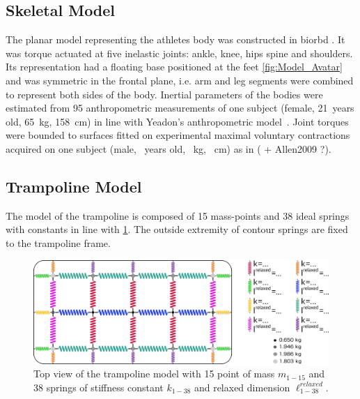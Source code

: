 \subsection{Skeletal Model}\label{subsec:2a}
The planar model representing the athletes body was constructed in biorbd \cite{michaudBiorbd2021}.
It was torque actuated at five inelastic joints: ankle, knee, hips spine and shoulders.
Its representation had a floating base positioned at the feet \ref{fig:Model_Avatar} and was symmetric in the frontal plane, i.e. arm and leg segments were combined to represent both sides of the body.
Inertial parameters of the bodies were estimated from 95 anthropometric measurements of one subject (female, 21~years old, 65~kg, 158~cm) in line with Yeadon's anthropometric model~\cite{yeadon1990simulation}.
Joint torques were bounded to surfaces fitted on experimental maximal voluntary contractions acquired on one subject (male, ~years old, ~kg, ~cm)  as in \cite{jackson2010mechanics} ( + Allen2009 ?).



\subsection{Trampoline Model}\label{subsec:2b}
The model of the trampoline is composed of 15 mass-points and 38 ideal springs with constants in line with \cite{jacques2008determining} \ref{fig:Model_Toile}.
The outside extremity of contour springs are fixed to the trampoline frame.

\begin{figure}[h!]
\centering
\includegraphics[width=\linewidth]{figures/Model_Toile.png}
\caption{Top view of the trampoline model with 15 point of mass $m_{1-15}$ and 38 springs of stiffness constant $k_{1-38}$ and relaxed dimension ${\ell}^{relaxed}_{1-38}$.}
\label{fig:Model_Toile}
\end{figure}



